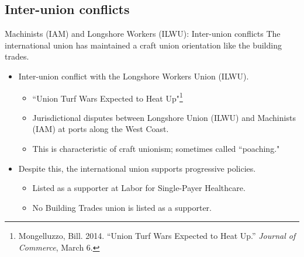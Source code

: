 \documentclass{beamer}
\begin{document}
\subsection{Inter-union conflicts}
\begin{frame}{Machinists (IAM) and Longshore Workers (ILWU): Inter-union conflicts}
The international union has maintained a craft union orientation like the building trades.
	\begin{itemize}
		\item Inter-union conflict with the Longshore Workers Union (ILWU).
		\begin{itemize}
			\item ``Union Turf Wars Expected to Heat Up"\footnote{\tiny Mongelluzzo, Bill. 2014. “Union Turf Wars Expected to Heat Up.” \textit{Journal of Commerce}, March 6.}
			\item Jurisdictional disputes between Longshore Union (ILWU) and Machinists (IAM) at ports along the West Coast.
			\item This is characteristic of craft unionism; sometimes called ``poaching."
		\end{itemize}
	\item Despite this, the international union supports progressive policies.
		\begin{itemize}
			\item Listed as a supporter at Labor for Single-Payer Healthcare.
			\item No Building Trades union is listed as a supporter.
		\end{itemize}
	\end{itemize}
\end{frame}
	
\end{document}
